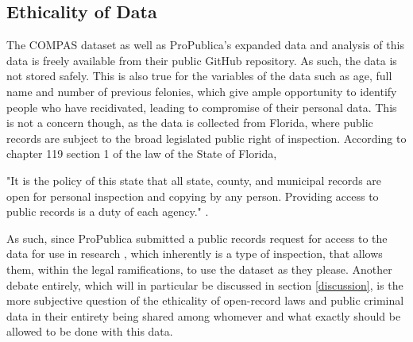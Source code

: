 \documentclass[11pt, fleqn, titlepage]{article}
\begin{document}
	
	
	\subsection{Ethicality of Data}
	The COMPAS dataset as well as ProPublica's expanded data and analysis of this data is freely available from their public GitHub repository. As such, the data is not stored safely. This is also true for the variables of the data such as age, full name and number of previous felonies, which give ample opportunity to identify people who have recidivated, leading to compromise of their personal data. This is not a concern though, as the data is collected from Florida, where public records are subject to the broad legislated public right of inspection. According to chapter 119 section 1 of the law of the State of Florida, 
	\begin{displayquote}
		"It is the policy of this state that all state, county, and municipal records are open for personal inspection and copying by any person. Providing access to public records is a duty of each agency." \cite{floridaLaw}.
	\end{displayquote}
	
	\noindent As such, since ProPublica submitted a public records request for access to the data for use in research \cite{propublicaAnalysis}, which inherently is a type of inspection, that allows them, within the legal ramifications, to use the dataset as they please. Another debate entirely, which will in particular be discussed in section \ref{discussion}, is the more subjective question of the ethicality of open-record laws and public criminal data in their entirety being shared among whomever and what exactly should be allowed to be done with this data.
	
		
\end{document}
